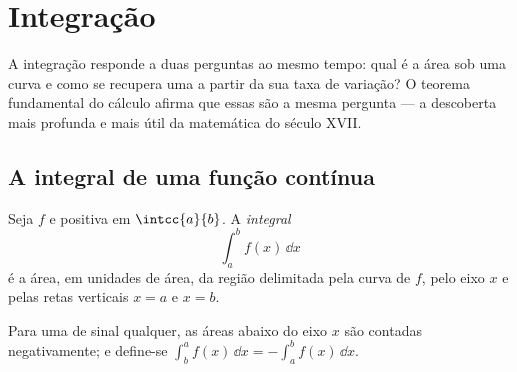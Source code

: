 \chapter{Integração}\label{ch:g12:integ}

A integração responde a duas perguntas ao mesmo tempo: qual é a área sob
uma curva e como se recupera uma  a partir da sua taxa de variação?
O teorema fundamental do cálculo afirma que essas são a mesma pergunta ---
a descoberta mais profunda e mais útil da matemática do século XVII.

\section{A integral de uma função contínua}

\begin{definition}\label{def:g12:integ:area}
Seja $f$  e positiva em $\intcc{a}{b}$. A
\emph{integral}
\[
\int_a^b f(x)\,\dd x
\]
é a área, em unidades de área, da região delimitada pela curva de $f$,
pelo eixo $x$ e pelas retas verticais $x = a$ e $x = b$.
\end{definition}

\begin{omfigure}
\end{omfigure}

Para uma  de sinal qualquer, as áreas abaixo do eixo $x$ são contadas
negativamente; e define-se
$\int_b^a f(x)\,\dd x = -\int_a^b f(x)\,\dd x$.

